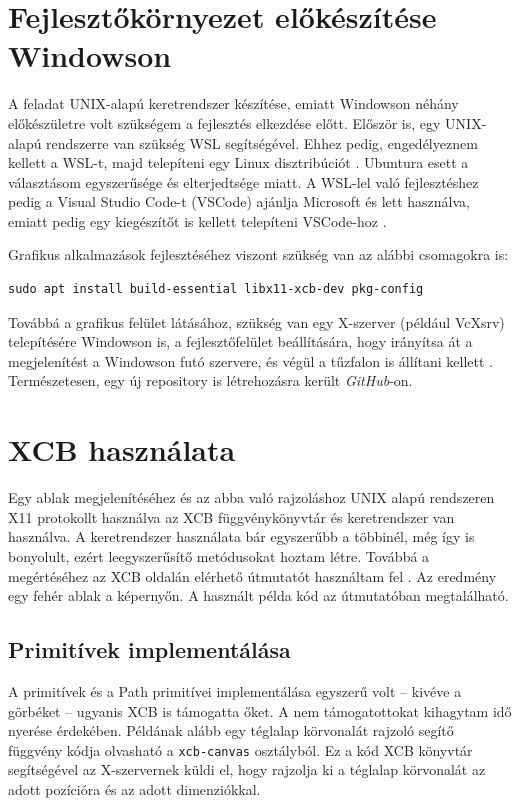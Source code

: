 
\section{Fejlesztőkörnyezet előkészítése Windowson}

A feladat UNIX-alapú keretrendszer készítése, emiatt Windowson néhány előkészületre volt szükségem a fejlesztés elkezdése előtt. Először is, egy UNIX-alapú rendszerre van szükség WSL segítségével. Ehhez pedig, engedélyeznem kellett a WSL-t, majd telepíteni egy Linux disztribúciót \cite{wsl-install}. Ubuntura esett a választásom egyszerűsége és elterjedtsége miatt. A WSL-lel való fejlesztéshez pedig a Visual Studio Code-t (VSCode) ajánlja Microsoft és lett használva, emiatt pedig egy kiegészítőt is kellett telepíteni VSCode-hoz \cite{wsl+vscode}.

Grafikus alkalmazások fejlesztéséhez viszont szükség van az alábbi csomagokra is:
\begin{verbatim}
sudo apt install build-essential libx11-xcb-dev pkg-config
\end{verbatim}

Továbbá a grafikus felület látásához, szükség van egy X-szerver (például VcXsrv) telepítésére Windowson is, a fejlesztőfelület beállítására, hogy irányítsa át a megjelenítést a Windowson futó szervere, és végül a tűzfalon is állítani kellett \cite{vcxsrv-setup}.
Természetesen, egy új repository is létrehozásra került \textit{GitHub}-on.

\section{XCB használata}

Egy ablak megjelenítéséhez és az abba való rajzoláshoz UNIX alapú rendszeren X11 protokollt használva az XCB függvénykönyvtár és keretrendszer van használva. A keretrendszer használata bár egyszerűbb a többinél, még így is bonyolult, ezért leegyszerűsítő metódusokat hoztam létre. Továbbá a megértéséhez az XCB oldalán elérhető útmutatót használtam fel \cite{xcb-tutorial}. Az eredmény egy fehér ablak a képernyőn. A használt példa kód az útmutatóban megtalálható.

\subsection{Primitívek implementálása}

A primitívek és a Path primitívei implementálása egyszerű volt -- kivéve a görbéket -- ugyanis XCB is támogatta őket. A nem támogatottokat kihagytam idő nyerése érdekében. Példának alább egy téglalap körvonalát rajzoló segítő függvény kódja olvasható a \texttt{xcb-canvas} osztályból. Ez a kód XCB könyvtár segítségével az X-szervernek küldi el, hogy rajzolja ki a téglalap körvonalát az adott pozícióra és az adott dimenziókkal.

